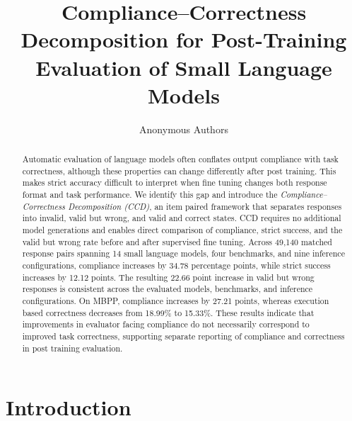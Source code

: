 \documentclass{article}
\title{Compliance--Correctness Decomposition for Post-Training Evaluation of Small Language Models}
\author{Anonymous Authors}
\begin{document}
\maketitle

\begin{abstract}
Automatic evaluation of language models often conflates output compliance with task correctness, although these properties can change differently after post training. This makes strict accuracy difficult to interpret when fine tuning changes both response format and task performance. We identify this gap and introduce the \emph{Compliance--Correctness Decomposition (CCD)}, an item paired framework that separates responses into invalid, valid but wrong, and valid and correct states. CCD requires no additional model generations and enables direct comparison of compliance, strict success, and the valid but wrong rate before and after supervised fine tuning. Across 49,140 matched response pairs spanning 14 small language models, four benchmarks, and nine inference configurations, compliance increases by 34.78 percentage points, while strict success increases by 12.12 points. The resulting 22.66 point increase in valid but wrong responses is consistent across the evaluated models, benchmarks, and inference configurations. On MBPP, compliance increases by 27.21 points, whereas execution based correctness decreases from 18.99\% to 15.33\%. These results indicate that improvements in evaluator facing compliance do not necessarily correspond to improved task correctness, supporting separate reporting of compliance and correctness in post training evaluation.
\end{abstract}



\setlength{\textfloatsep}{6pt}
\setlength{\floatsep}{6pt}
\setlength{\belowcaptionskip}{-2pt}

\section{Introduction}
\label{sec:introduction}
\end{document}
